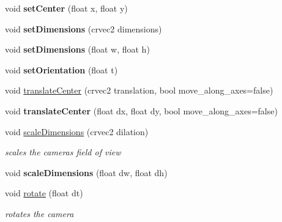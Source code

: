 \begin{DoxyCompactItemize}
void {\bfseries set\+Center} (float x, float y)
\item 
\mbox{\label{classnta_1_1Camera2D_a3b133bef64504b488b04ce18e206544b}} 
void {\bfseries set\+Dimensions} (crvec2 dimensions)
\item 
\mbox{\label{classnta_1_1Camera2D_a253821b9dc464678c80ff92c31a8689f}} 
void {\bfseries set\+Dimensions} (float w, float h)
\item 
\mbox{\label{classnta_1_1Camera2D_ae1b3a5ef4259881936317fc0c18c4a13}} 
void {\bfseries set\+Orientation} (float t)
\item 
void \hyperlink{classnta_1_1Camera2D_a711b1b64b4e0bbca5c598ac15609f498}{translate\+Center} (crvec2 translation, bool move\+\_\+along\+\_\+axes=false)
\item 
\mbox{\label{classnta_1_1Camera2D_a95ecd50d9ec6031b4d015f33d442d096}} 
void {\bfseries translate\+Center} (float dx, float dy, bool move\+\_\+along\+\_\+axes=false)
\item 
\mbox{\label{classnta_1_1Camera2D_aa89b58a2a5ca0c3df56d07e2722afcd6}} 
void \hyperlink{classnta_1_1Camera2D_aa89b58a2a5ca0c3df56d07e2722afcd6}{scale\+Dimensions} (crvec2 dilation)
\begin{DoxyCompactList}\small\item\em scales the camera\textquotesingle{}s field of view \end{DoxyCompactList}\item 
\mbox{\label{classnta_1_1Camera2D_ae5e80a376fe4b6457e712c6bc94b8584}} 
void {\bfseries scale\+Dimensions} (float dw, float dh)
\item 
\mbox{\label{classnta_1_1Camera2D_a4529f2111c2621764c42365df5a504e0}} 
void \hyperlink{classnta_1_1Camera2D_a4529f2111c2621764c42365df5a504e0}{rotate} (float dt)
\begin{DoxyCompactList}\small\item\em rotates the camera \end{DoxyCompactList}\end{DoxyCompactItemize}
